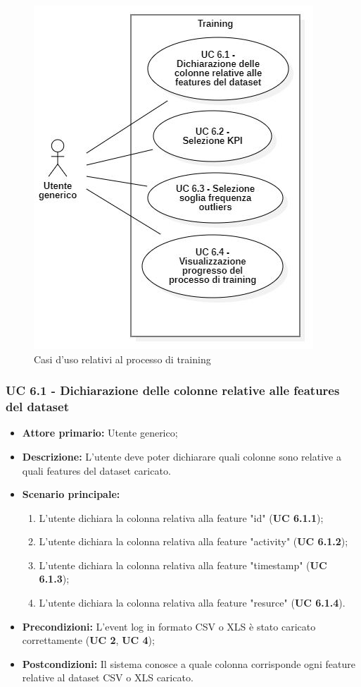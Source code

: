 \begin{figure}[H]
    \centering
    \includegraphics[scale=0.6]{immagini/usecase/cd3.JPG}
    \caption{Casi d'uso relativi al processo di training}
\end{figure}

\subsubsection{UC 6.1 - Dichiarazione delle colonne relative alle features del dataset}
\begin{itemize}
	\item \textbf{Attore primario:} Utente generico;
	\item \textbf{Descrizione:} L'utente deve poter dichiarare quali colonne sono relative a quali features del dataset caricato.
	\item \textbf{Scenario principale:} 
		\begin{enumerate}
			\item L'utente dichiara la colonna relativa alla feature "id" (\textbf{UC 6.1.1});
			\item L'utente dichiara la colonna relativa alla feature "activity" (\textbf{UC 6.1.2});
			\item L'utente dichiara la colonna relativa alla feature "timestamp" (\textbf{UC 6.1.3});
			\item L'utente dichiara la colonna relativa alla feature "resurce" (\textbf{UC 6.1.4}).
		\end{enumerate}
	
	\item \textbf{Precondizioni:} L'event log in formato CSV o XLS è stato caricato correttamente (\textbf{UC 2}, \textbf{UC 4});
	\item \textbf{Postcondizioni:} Il sistema conosce a quale colonna corrisponde ogni feature relative al dataset CSV o XLS caricato.
\end{itemize}

